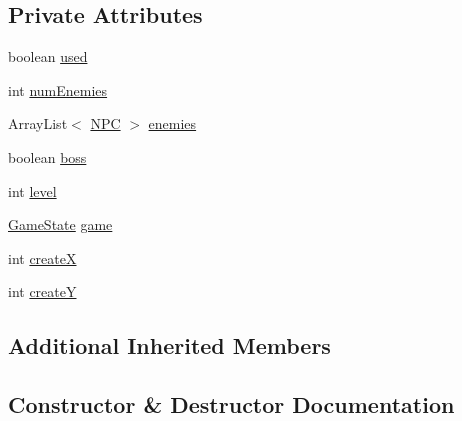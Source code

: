 \subsection*{Private Attributes}
\begin{DoxyCompactItemize}
\item 
boolean \mbox{\hyperlink{classdetectors_1_1_enemy_spawner_aad3d7a72c57ee7c071900199b74ca0bf}{used}}
\item 
int \mbox{\hyperlink{classdetectors_1_1_enemy_spawner_a869e98916cf4024aa0365094b7228aab}{num\+Enemies}}
\item 
Array\+List$<$ \mbox{\hyperlink{classentities_1_1_n_p_c}{N\+PC}} $>$ \mbox{\hyperlink{classdetectors_1_1_enemy_spawner_a69ed1149c94fb7a5fe971ed55b73820b}{enemies}}
\item 
boolean \mbox{\hyperlink{classdetectors_1_1_enemy_spawner_a1d4038a75d86f476b072ebb3d4a0a345}{boss}}
\item 
int \mbox{\hyperlink{classdetectors_1_1_enemy_spawner_a7a6789978d67aac73834d97f875ad213}{level}}
\item 
\mbox{\hyperlink{classstates_1_1_game_state}{Game\+State}} \mbox{\hyperlink{classdetectors_1_1_enemy_spawner_af4c20a8a788ed80f1379da33fa15d4a2}{game}}
\item 
int \mbox{\hyperlink{classdetectors_1_1_enemy_spawner_ab14511f92f58a32c0b062c97add58a51}{createX}}
\item 
int \mbox{\hyperlink{classdetectors_1_1_enemy_spawner_ac460462da79f38d12eb840cc4d844759}{createY}}
\end{DoxyCompactItemize}
\subsection*{Additional Inherited Members}


\subsection{Constructor \& Destructor Documentation}
\mbox{\label{classdetectors_1_1_enemy_spawner_a3b9b42bf2443755b5ee1839ff2195575}} 
